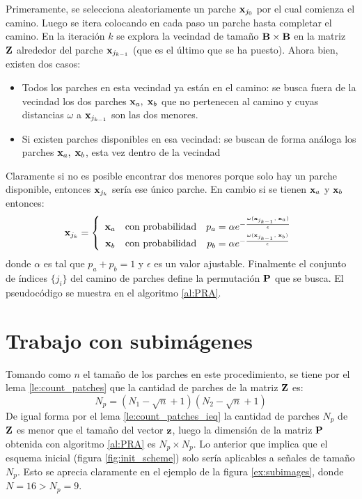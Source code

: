Primeramente, se selecciona aleatoriamente un parche $\x_{j_0}$ por el cual comienza el camino. Luego se itera colocando en cada paso un parche hasta completar el camino. En la iteraci\'on $k$ se explora la vecindad de tamaño $\B \times \B$ en la matriz $\Z$ alrededor del parche $\x_{j_{k - 1}}$ (que es el \'ultimo que se ha puesto). Ahora bien, existen dos casos:
\begin{itemize}
\item Todos los parches en esta vecindad ya están en el camino: se busca fuera de la vecindad los dos parches $\x_a,\; \x_b$ que no pertenecen al camino y cuyas distancias $\omega$ a $\x_{j_{k - 1}}$ son las dos menores.
\item Si existen parches disponibles en esa vecindad: se buscan de forma an\'aloga los parches $\x_a,\; \x_b$, esta vez dentro de la vecindad
\end{itemize}
Claramente si no es posible encontrar dos menores porque solo hay un parche disponible, entonces $\x_{j_k}$ ser\'ia ese \'unico parche. En cambio si se tienen $\x_a$ y $\x_b$ entonces:
\begin{equation}
	\x_{j_k} = \left\{
		\begin{array}{ccc}
		\x_a &\mbox{con probabilidad}& p_a = \alpha e^{-\frac{\omega(\x_{j_{k - 1}},\; \x_a)}{\epsilon}}\\
		\x_b &\mbox{con probabilidad}& p_b = \alpha e^{-\frac{\omega(\x_{j_{k - 1}},\; \x_b)}{\epsilon}}\\
		\end{array}
	\right.
	\label{eq:choosing_patch}
\end{equation}
donde $\alpha$ es tal que $p_a + p_b = 1$ y $\epsilon$ es un valor ajustable. Finalmente el conjunto de \'indices $\{j_i\}$ del camino de parches define la permutaci\'on $\P$ que se busca. El pseudoc\'odigo se muestra en el algoritmo \ref{al:PRA}.

\section{Trabajo con subim\'agenes}
Tomando como $n$ el tamaño de los parches en este procedimiento, se tiene por el lema \ref{le:count_patches} que la cantidad de parches de la matriz $\Z$ es: 
\begin{equation}
	N_p = (N_1 - \sqrt{n} + 1)(N_2 - \sqrt{n} + 1)
	\label{eq:patches}
\end{equation}
De igual forma por el lema \ref{le:count_patches_ieq} la cantidad de parches $N_p$ de $\Z$ es menor que el tamaño del vector $\z$, luego la dimensi\'on de la matriz $\P$ obtenida con algoritmo \ref{al:PRA} es $N_p \times N_p$. Lo anterior que implica que el esquema inicial (figura \ref{fig:init_scheme}) solo ser\'ia aplicables a señales de tamaño $N_p$. Esto se aprecia claramente en el ejemplo de la figura \ref{ex:subimages}, donde $N = 16 > N_p = 9$.

